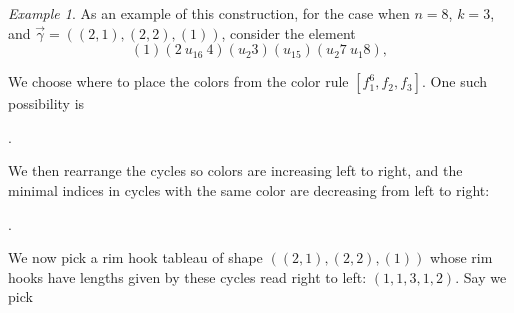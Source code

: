 \documentclass[a4paper,12pt]{amsart}
\theoremstyle{plain}
\theoremstyle{definition}
\theoremstyle{remark}
\newtheorem{example}[theorem]{Example}
\begin{document}
 \begin{example}\label{example:objects}
As an example of this construction, for the case when $n = 8$, $k = 3$, and $\vec{\gamma} = ((2,1),(2,2),(1))$,
consider the element 
\begin{equation*}
(1)(2~ u_16~ 4) (u_2 3)  (u_15 )(u_2 7 ~ u_1 8),
\end{equation*}

We choose where to place the colors from the color rule $[f_1^6,f_2,f_3]$. One such possibility is 
\begin{center}
.
\end{center}

We then rearrange the cycles so colors are increasing left to right, and the minimal indices in cycles with the same color are decreasing from left to right:
\begin{center}
.
\end{center}

We now pick a rim hook tableau of shape $((2,1),(2,2),(1))$ whose rim hooks have lengths given by these cycles read right to left: $(1,1,3,1,2)$. Say we pick


\end{example}
\end{document}
